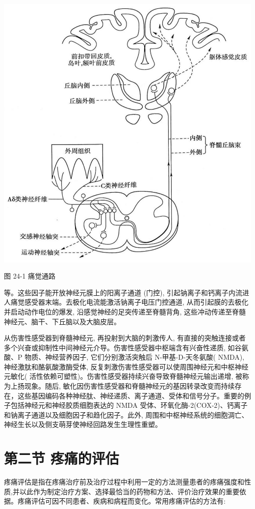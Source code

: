 \documentclass[10pt]{article}
\begin{document}
\begin{center}
\includegraphics[max width=\textwidth]{2024_07_09_002a177993bd97d1d6d7g-249}
\end{center}

图 24-1 痛觉通路

等。这些因子能开放神经元膜上的阳离子通道 (门控), 引起钠离子和钙离子内流进人痛觉感受器末端。去极化电流能激活钠离子电压门控通道, 从而引起膜的去极化并启动动作电位的爆发, 沿感觉神经的足突传递至脊髓背角, 这些冲动传递至脊髓神经元、脑干、下丘脑以及大脑皮层。

从伤害性感受器到脊髓神经元, 再投射到大脑的刺激传人, 有直接的突触连接或者多个兴奋或抑制性中间神经元介导。伤害性感受器中枢端含有兴奋性递质, 如谷氨酸、P 物质、神经营养因子, 它们分别激活突触后 N-甲基-D-天冬氨酸( NMDA), 神经激肽和酪氨酸激酶受体, 反复刺激伤害性感受器可以使周围神经元和中枢神经元敏化( 活性依赖可塑性)。伤害性感受器持续兴奋导致脊髓神经元输出递增, 被称为上扬现象。随后, 敏化因伤害性感受器和脊髓神经元的基因转录改变而持续存在，这些基因编码各种神经肽、神经递质、离子通道、受体和信号分子。重要的例子包括神经元和神经胶质细胞表达的 NMDA 受体、环氧化酶-2(COX-2)、钙离子和钠离子通道以及细胞因子和趋化因子。此外, 周围和中枢神经系统的细胞淍亡、神经生长以及侧支萌芽使神经回路发生生理性重塑。

\section*{第二节 疼痛的评估}
疼痛评估是指在疼痛治疗前及治疗过程中利用一定的方法测量患者的疼痛强度和性质,并以此作为制定治疗方案、选择最恰当的药物和方法、评价治疗效果的重要依据。疼痛评估可因不同患者、疾病和病程而变化。常用疼痛评估的方法有:
\end{document}
